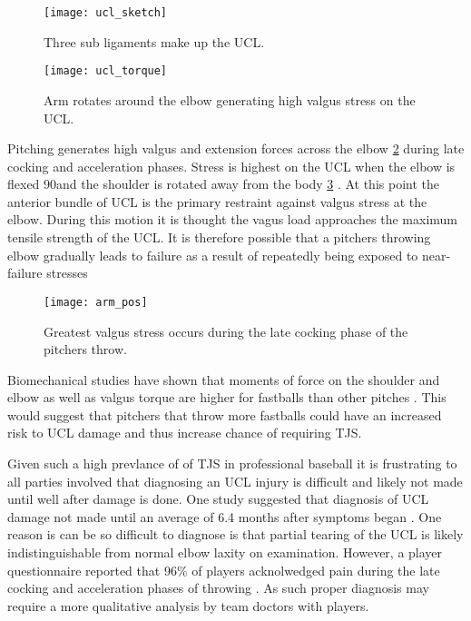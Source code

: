 \begin{figure}[ht]
    \centering
        \texttt{[image: ucl\_sketch]}
    \caption{Three sub ligaments make up the UCL. \cite{Safran2005}}
    \label{fig:ucl_sketch}
\end{figure}

\begin{figure}[hb]
    \centering
        \texttt{[image: ucl\_torque]}
    \caption{Arm rotates around the elbow generating high valgus stress on the UCL. \cite{NYTucl}}
    \label{fig:ucl_torque}
\end{figure}

Pitching generates high valgus and extension forces across the elbow \ref{fig:ucl_torque} during late cocking and acceleration phases. Stress is highest on the UCL when the elbow is flexed 90\degree and the shoulder is rotated away from the body \ref{fig:arm_pos} \cite{Fleisig2015}. At this point the anterior bundle of UCL is the primary restraint against valgus stress at the elbow. During this motion it is thought the vagus load approaches the maximum tensile strength of the UCL. It is therefore possible that a pitchers throwing elbow gradually leads to failure as a result of repeatedly being exposed to near-failure stresses \cite{Cain2010}

\begin{figure}[h]
    \centering
        \texttt{[image: arm\_pos]}
    \caption{Greatest valgus stress occurs during the late cocking phase of the pitchers throw. \cite{NYTucl}}
    \label{fig:arm_pos}
\end{figure}

Biomechanical studies have shown that moments of force on the shoulder and elbow as well as valgus torque are higher for fastballs than other pitches \cite{Keller2016}. This would suggest that pitchers that throw more fastballs could have an increased risk to UCL damage and thus increase chance of requiring TJS.

Given such a high prevlance of of TJS in professional baseball it is frustrating to all parties involved that diagnosing an UCL injury is difficult and likely not made until well after damage is done. One study suggested that diagnosis of UCL damage not made until an average of 6.4 months after symptoms began \cite{Cain2010}. One reason is can be so difficult to diagnose is that partial tearing of the UCL is likely indistinguishable from normal elbow laxity on examination. However, a player questionnaire reported that 96\% of players acknolwedged pain during the late cocking and acceleration phases of throwing \cite{Cain2010}. As such proper diagnosis may require a more qualitative analysis by team doctors with players.

